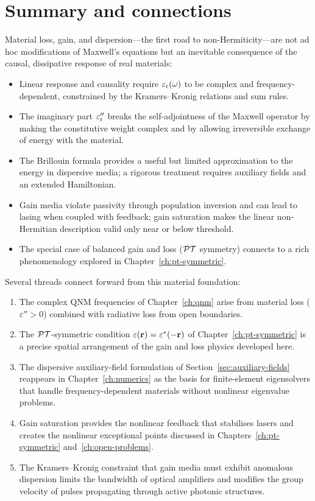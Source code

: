 \section{Summary and connections}
\label{sec:ch5-forward}

Material loss, gain, and dispersion---the first road to
non-Hermiticity---are not ad hoc modifications of Maxwell's
equations but an inevitable consequence of the causal, dissipative
response of real materials:

\begin{itemize}
 \item Linear response and causality require $\varepsilon_{\mathrm{r}}(\omega)$ to be
 complex and frequency-dependent, constrained by the
 Kramers--Kronig relations and sum rules.
 \item The imaginary part $\varepsilon_{\mathrm{r}}''$ breaks the self-adjointness of the
 Maxwell operator by making the constitutive weight complex and by
 allowing irreversible exchange of energy with the material.
 \item The Brillouin formula provides a useful but limited
 approximation to the energy in dispersive media; a rigorous
 treatment requires auxiliary fields and an extended Hamiltonian.
 \item Gain media violate passivity through population inversion and
 can lead to lasing when coupled with feedback; gain saturation
 makes the linear non-Hermitian description valid only near or
 below threshold.
 \item The special case of balanced gain and loss ($\mathcal{PT}$ symmetry)
 connects to a rich phenomenology explored in
 Chapter~\ref{ch:pt-symmetric}.
\end{itemize}

Several threads connect forward from this material foundation:
\begin{enumerate}
 \item The complex QNM frequencies of Chapter~\ref{ch:qnm} arise from
 material loss ($\varepsilon'' > 0$) combined with radiative loss
 from open boundaries.
 \item The $\mathcal{PT}$-symmetric condition
 $\varepsilon(\mathbf{r}) = \varepsilon^*(-\mathbf{r})$ of
 Chapter~\ref{ch:pt-symmetric} is a precise spatial arrangement of
 the gain and loss physics developed here.
 \item The dispersive auxiliary-field formulation of
 Section~\ref{sec:auxiliary-fields} reappears in
 Chapter~\ref{ch:numerics} as the basis for finite-element
 eigensolvers that handle frequency-dependent materials without
 nonlinear eigenvalue problems.
 \item Gain saturation provides the nonlinear feedback that stabilises
 lasers and creates the nonlinear exceptional points discussed in
 Chapters~\ref{ch:pt-symmetric} and~\ref{ch:open-problems}.
 \item The Kramers--Kronig constraint that gain media must exhibit
 anomalous dispersion limits the bandwidth of optical amplifiers and
 modifies the group velocity of pulses propagating through active
 photonic structures.
\end{enumerate}

